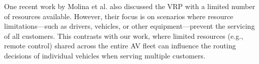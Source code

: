One recent work by Molina et al. \cite{MOLINA2020103745} also discussed the VRP with a limited number of resources available. However, their focus is on scenarios where resource limitations—such as drivers, vehicles, or other equipment—prevent the servicing of all customers. This contrasts with our work, where limited resources (e.g., remote control) shared across the entire AV fleet can influence the routing decisions of individual vehicles when serving multiple customers.